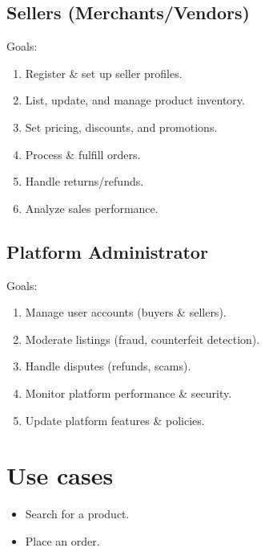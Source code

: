 \documentclass[a4paper,10pt]{article}
\begin{document}
\subsection{Sellers (Merchants/Vendors)}

Goals:


\begin{enumerate}
    \item Register \& set up seller profiles.

    \item List, update, and manage product inventory.

    \item Set pricing, discounts, and promotions.

    \item Process \& fulfill orders.

    \item Handle returns/refunds.

    \item Analyze sales performance.
\end{enumerate}

\subsection{Platform Administrator}

Goals:

\begin{enumerate}
    \item Manage user accounts (buyers \& sellers).

    \item Moderate listings (fraud, counterfeit detection).

    \item Handle disputes (refunds, scams).

    \item Monitor platform performance \& security.

    \item Update platform features \& policies.
\end{enumerate}

\section{Use cases}

\begin{itemize}
    \item Search for a product.
    \item Place an order.
\end{itemize}
\end{document}
